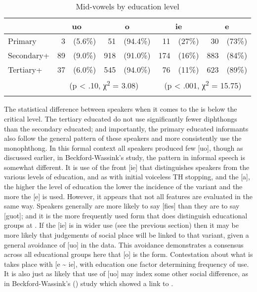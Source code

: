 \begin{table}
\begin{tabular}{l*{4}{r@{ }r}}
\lsptoprule
    &       \multicolumn{2}{c}{uo}      &    \multicolumn{2}{c}{o}  & \multicolumn{2}{c}{ie}   &   \multicolumn{2}{c}{e}\\
\midrule
Primary     & 3  & (5.6\%)  &     51  & (94.4\%) & 11  & (27\%)   &      30 & (73\%)\\
Secondary+ & 89 & (9.0\%)    &     918 & (91.0\%)   & 174 & (16\%)   &     883 & (84\%)   \\
Tertiary+  & 37 & (6.0\%)    &     545 & (94.0\%)   & 76  & (11\%)   &     623 & (89\%)\\\cmidrule(lr){2-5}\cmidrule(lr){6-9}
   & \multicolumn{4}{c}{(p < .10, χ\textsuperscript{2} = 3.08)}  & \multicolumn{4}{c}{(p < .001, χ\textsuperscript{2} = 15.75)}\\
\lspbottomrule
\end{tabular}
\caption{Mid-vowels by education level}
\label{tab:3.6}
\end{table}

The statistical difference between speakers when it comes to the  is below the critical level.  The tertiary educated do not use significantly fewer diphthongs than the secondary educated; and importantly, the primary educated informants also follow the general pattern of these speakers and more consistently use the monophthong.  In this formal context all speakers produced few [uo], though as discussed earlier, in Beckford-Wassink’s study, the pattern in informal speech is somewhat different.  It is use of the front [ie] that distinguishes speakers from the various levels of education, and as with initial voiceless TH stopping,  and the  [a], the higher the level of education the lower the incidence of the  variant and the more the [e] is used.  However, it appears that not all  features are evaluated in the same way.  Speakers generally are more likely to say [fies] than they are to say [guot]; and it is the more frequently used  form that does distinguish educational groups at .  If the [ie] is in wider use (see the previous section) then it may be more likely that judgements of social place will be linked to that variant, given a general avoidance of [uo] in the data.  This avoidance demonstrates a consensus across all educational groups here that [o] is the  form.  Contestation about what is  takes place with [e {\textasciitilde} ie], with education one factor determining frequency of use.  It is also just as likely that use of [uo] may index some other social difference, as in Beckford-Wassink’s (\citeyear[155]{BeckfordWassink2001}) study which showed a link to .    

